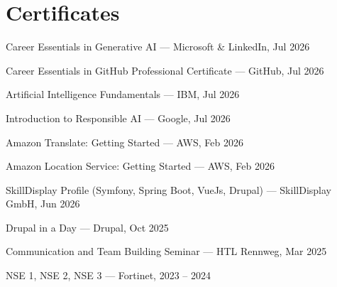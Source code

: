\section*{Certificates}

\begin{tightlist}
  \item Career Essentials in Generative AI --- Microsoft \& LinkedIn, Jul 2026
  \item Career Essentials in GitHub Professional Certificate --- GitHub, Jul 2026
  \item Artificial Intelligence Fundamentals --- IBM, Jul 2026
  \item Introduction to Responsible AI --- Google, Jul 2026
  \item Amazon Translate: Getting Started --- AWS, Feb 2026
  \item Amazon Location Service: Getting Started --- AWS, Feb 2026
  \item SkillDisplay Profile (Symfony, Spring Boot, VueJs, Drupal) --- SkillDisplay GmbH, Jun 2026
  \item Drupal in a Day --- Drupal, Oct 2025
  \item Communication and Team Building Seminar --- HTL Rennweg, Mar 2025
  \item NSE 1, NSE 2, NSE 3 --- Fortinet, 2023 -- 2024
\end{tightlist}
